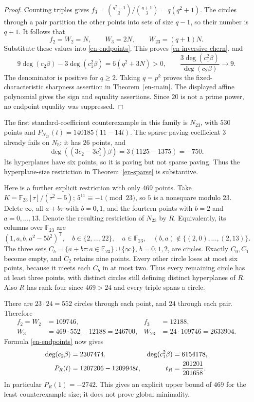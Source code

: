 \documentclass[12pt]{amsart}
\theoremstyle{definition}
\theoremstyle{remark}
\numberwithin{equation}{section}
\begin{document}
\begin{proof}
Counting triples gives $f_3=\binom{q^2+1}{3}/\binom{q+1}{3}=q(q^2+1)$. The circles through a pair partition the other points into sets of size $q-1$, so their number is $q+1$. It follows that
\[
 f_2=W_2=N,\qquad W_3=2N,\qquad W_{23}=(q+1)N.
\]
Substitute these values into \eqref{en-endpoints}. This proves \eqref{en-inversive-chern}, and
\[
 9\deg(c_2\beta)-3\deg(c_1^2\beta)=6(q^2+3N)>0,
 \qquad\frac{3\deg(c_1^2\beta)}{\deg(c_2\beta)}\longrightarrow9.
\]
The denominator is positive for $q\geq2$. Taking $q=p^k$ proves the fixed-characteristic sharpness assertion in Theorem~\ref{en-main}. The displayed affine polynomial gives the sign and equality assertions. Since $20$ is not a prime power, no endpoint equality was suppressed.
\end{proof}

The first standard-coefficient counterexample in this family is $N_{23}$, with $530$ points and $P_{N_{23}}(t)=140185(11-14t)$. The sparse-paving coefficient $3$ already fails on $N_5$: it has $26$ points, and
\[
 \deg((3c_2-3c_1^2)\beta)=3(1125-1375)=-750.
\]
Its hyperplanes have six points, so it is paving but not sparse paving. Thus the hyperplane-size restriction in Theorem~\ref{en-sparse} is substantive.

Here is a further explicit restriction with only $469$ points. Take $K=\mathbb F_{23}[\tau]/(\tau^2-5)$; $5^{11}\equiv-1\pmod{23}$, so $5$ is a nonsquare modulo $23$. Delete $\infty$, all $a+b\tau$ with $b=0,1$, and the fourteen points with $b=2$ and $a=0,\ldots,13$. Denote the resulting restriction of $N_{23}$ by $R$. Equivalently, its columns over $\mathbb F_{23}$ are
\begin{equation}\label{en-small-columns}
 (1,a,b,a^2-5b^2)^{\mathsf T},\quad
 b\in\{2,\ldots,22\},\quad a\in\mathbb F_{23},\quad
 (b,a)\notin\{(2,0),\ldots,(2,13)\}.
\end{equation}
The three sets $C_b=\{a+b\tau:a\in\mathbb F_{23}\}\cup\{\infty\}$, $b=0,1,2$, are circles. Exactly $C_0,C_1$ become empty, and $C_2$ retains nine points. Every other circle loses at most six points, because it meets each $C_b$ in at most two. Thus every remaining circle has at least three points, with distinct circles still defining distinct hyperplanes of $R$. Also $R$ has rank four since $469>24$ and every triple spans a circle.

There are $23\cdot24=552$ circles through each point, and $24$ through each pair. Therefore
\begin{align*}
 f_2=W_2&=109746,& f_3&=12188,\\
 W_3&=469\cdot552-12188=246700,& W_{23}&=24\cdot109746=2633904.
\end{align*}
Formula \eqref{en-endpoints} now gives
\begin{align}\label{en-small-counter}
 \deg(c_2\beta)&=2307474,& \deg(c_1^2\beta)&=6154178,\notag\\
 P_R(t)&=1207206-1209948t,& t_R&=\frac{201201}{201658}.
\end{align}
In particular $P_R(1)=-2742$. This gives an explicit upper bound of $469$ for the least counterexample size; it does not prove global minimality.
\end{document}
